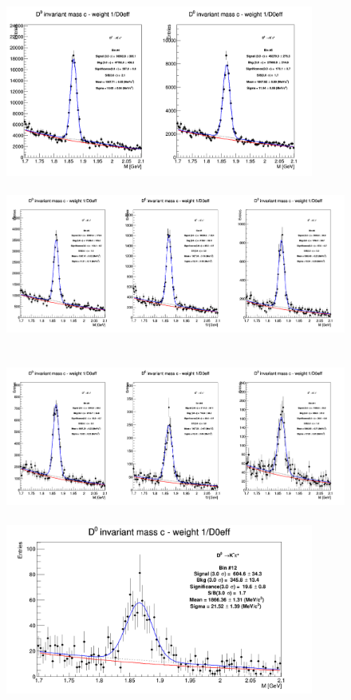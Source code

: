 \begin{figure}[!htp]
\centering

{\includegraphics[width=1\linewidth, height=5.6cm]{figuresVsCent/Dzero/MassPlots/020/InvMassDistributions_Dzero_Bins4to5.png}}
{\includegraphics[width=1\linewidth, height=5.6cm]{figuresVsCent/Dzero/MassPlots/020/InvMassDistributions_Dzero_Bins6to8.png}}
{\includegraphics[width=1\linewidth, height=5.6cm]{figuresVsCent/Dzero/MassPlots/020/InvMassDistributions_Dzero_Bins9to11.png}}
{\includegraphics[width=0.6\linewidth, height=5.6cm]{figuresVsCent/Dzero/MassPlots/020/InvMassDistributions_Dzero_Bins12to12.png}}


\end{figure}
